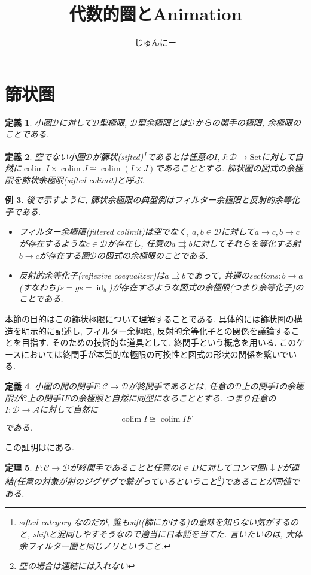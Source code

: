 \documentclass{ltjsarticle}
\title{代数的圏とAnimation}
\author{じゅんにー}
\theoremstyle{mystyle}
\newtheorem{theorem}{定理}[section]
\newtheorem{dfn}[theorem]{定義}
\newtheorem{ex}[theorem]{例}       %
\begin{document}
\maketitle
\tableofcontents


\section{篩状圏}
\begin{dfn}
  小圏$\mathcal D$に対して$\mathcal D$型極限, $\mathcal D$型余極限とは$\mathcal D$からの関手の極限, 余極限のことである.
\end{dfn}
\begin{dfn}
  空でない小圏$\mathcal D$が篩状(sifted)\footnote{sifted category なのだが, 誰もsift(篩にかける)の意味を知らない気がするのと, shiftと混同しやすそうなので適当に日本語を当てた. 言いたいのは, 大体余フィルター圏と同じノリということ.}であるとは任意の$I,J:\mathcal D\to \mathrm{Set}$に対して自然に$\operatorname{colim}I\times\operatorname{colim}J\cong\operatorname{colim}(I\times J)$であることとする.
  篩状圏の図式の余極限を篩状余極限(sifted colimit)と呼ぶ.
\end{dfn}
\begin{ex}
  後で示すように, 篩状余極限の典型例はフィルター余極限と反射的余等化子である.
  \begin{itemize}
    \item フィルター余極限(filtered colimit)は空でなく, $a,b\in\mathcal D$に対して$a\to c, b\to c$が存在するような$c\in\mathcal D$が存在し, 任意の$a\rightrightarrows b$に対してそれらを等化する射$b\to c$が存在する圏$\mathcal D$の図式の余極限のことである.
    \item 反射的余等化子(reflexive coequalizer)は$a\rightrightarrows b$であって, 共通のsection$s:b\to a$ (すなわち$fs=gs=\operatorname{id}_{b}$)が存在するような図式の余極限(つまり余等化子)のことである.
  \end{itemize}
\end{ex} 
本節の目的はこの篩状極限について理解することである. 
具体的には篩状圏の構造を明示的に記述し, フィルター余極限, 反射的余等化子との関係を議論することを目指す.
そのための技術的な道具として, 終関手という概念を用いる. 
このケースにおいては終関手が本質的な極限の可換性と図式の形状の関係を繋いでいる.
\begin{dfn}
小圏の間の関手$F:\mathcal C\to \mathcal D$が終関手であるとは, 
任意の$\mathcal D$上の関手$I$の余極限が$\mathcal{C}$上の関手$IF$の余極限と自然に同型になることとする.
つまり任意の$I:\mathcal D\to\mathcal A$に対して自然に
\[\operatorname{colim}I\cong\operatorname{colim}IF\]
である.
\end{dfn}
この証明は\cite{Final}にある. 
\begin{theorem}
$F:\mathcal C\to\mathcal D$が終関手であることと任意の$i\in D$に対してコンマ圏$i\downarrow F$が連結(任意の対象が射のジグザグで繋がっているということ\footnote{空の場合は連結には入れない})であることが同値である.
\end{theorem}
\end{document}
